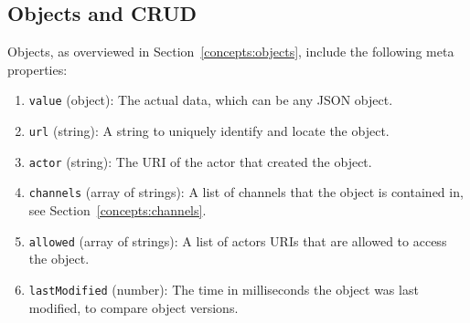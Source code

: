 

\subsection{Objects and CRUD}

Objects, as overviewed in Section~\ref{concepts:objects}, include
the following meta properties:
\begin{enumerate}
\item
\texttt{value} (object): The actual data, which can be any JSON object.
\item
\texttt{url} (string): A string to uniquely identify and locate the object.
\item
\texttt{actor} (string): The URI of the actor that created the object.
\item
\texttt{channels} (array of strings): A list of channels that the object is contained in, see Section~\ref{concepts:channels}.
\item
\texttt{allowed} (array of strings): A list of actors URIs that are allowed to access the object.
\item
\texttt{lastModified} (number): The time in milliseconds the object was last modified, to compare object versions.
\end{enumerate}

